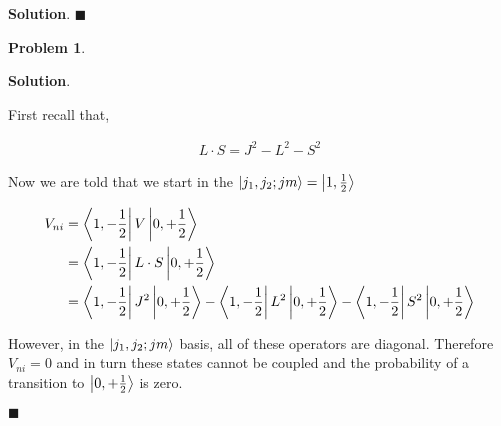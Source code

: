\documentclass[12pt]{article}
\newtheorem{p}{Problem}
\theoremstyle{definition}
\newenvironment{s}{%
        \begin{trivlist} \item \textbf{Solution}. }{%
            \hspace*{\fill} $\blacksquare$\end{trivlist}}%
\begin{document}
{\begin{s}
\end{s}

\begin{p}
\end{p}

\begin{s}

First recall that,

\begin{align*}
L\cdot S = J^{2} - L^{2} - S^{2}
\end{align*}

Now we are told that we start in the $\ket{j_{1},j_{2}; jm} = \ket{1,\frac{1}{2}}$

\begin{align*}
V_{ni} &= \bra{1,-\frac{1}{2}}V\ket{0,+\frac{1}{2}}\\
&= \bra{1,-\frac{1}{2}}L\cdot S\ket{0,+\frac{1}{2}}\\
&= \bra{1,-\frac{1}{2}}J^{2}\ket{0,+\frac{1}{2}} - \bra{1,-\frac{1}{2}}L^{2}\ket{0,+\frac{1}{2}} - \bra{1,-\frac{1}{2}}S^{2}\ket{0,+\frac{1}{2}}
\end{align*}

However, in the $\ket{j_{1},j_{2}; jm}$ basis, all of these operators are diagonal. Therefore $V_{ni} = 0$ and in turn these states cannot be coupled and the probability of a transition to $\ket{0,+\frac{1}{2}}$ is zero.

\end{s}
\end{document}
